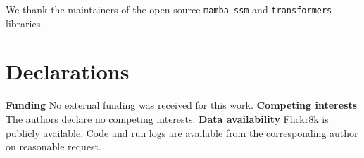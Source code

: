 \documentclass[pdflatex,sn-mathphys-num]{sn-jnl}
\begin{document}
\backmatter

We thank the maintainers of the open-source \texttt{mamba\_ssm} and \texttt{transformers} libraries.

\section*{Declarations}
\textbf{Funding} No external funding was received for this work.
\textbf{Competing interests} The authors declare no competing interests.
\textbf{Data availability} Flickr8k is publicly available. Code and run logs are available from the corresponding author on reasonable request.


\end{document}
